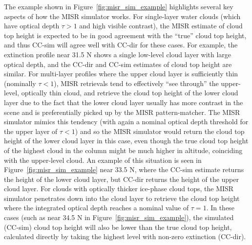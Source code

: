 The example shown in Figure~\ref{fig:misr_sim_example} highlights
several key aspects of how the MISR simulator works. For single-layer
water clouds (which have optical depth \(\tau > 1\) and high visible
contrast), the MISR estimate of cloud top height is expected to be in
good agreement with the ``true'' cloud top height, and thus CC-sim will
agree well with CC-dir for these cases. For example, the extinction
profile near 31.5 N shows a single low-level cloud layer with large
optical depth, and the CC-dir and CC-sim estimates of cloud top height
are similar. For multi-layer profiles where the upper cloud layer is
sufficiently thin (nominally \(\tau < 1\)), MISR retrievals tend to
effectively ``see through'' the upper-level, optically thin cloud, and
retrieve the cloud top height of the lower cloud layer due to the fact
that the lower cloud layer usually has more contrast in the scene and is
preferentially picked up by the MISR pattern-matcher. The MISR simulator
mimics this tendency (with again a nominal optical depth threshold for
the upper layer of \(\tau < 1\)) and so the MISR simulator would return
the cloud top height of the lower cloud layer in this case, even though
the true cloud top height of the highest cloud in the column might be
much higher in altitude, coinciding with the upper-level cloud. An
example of this situation is seen in Figure~\ref{fig:misr_sim_example}
near 33.5 N, where the CC-sim estimate returns the height of the lower
cloud layer, but CC-dir returns the height of the upper cloud layer. For
clouds with optically thicker ice-phase cloud tops, the MISR simulator
penetrates down into the cloud layer to retrieve the cloud top height
where the integrated optical depth reaches a nominal value of
\(\tau = 1\). In these cases (such as near 34.5 N in
Figure~\ref{fig:misr_sim_example}), the simulated (CC-sim) cloud top
height will also be lower than the true cloud top height, calculated
directly by taking the highest level with non-zero extinction (CC-dir).

